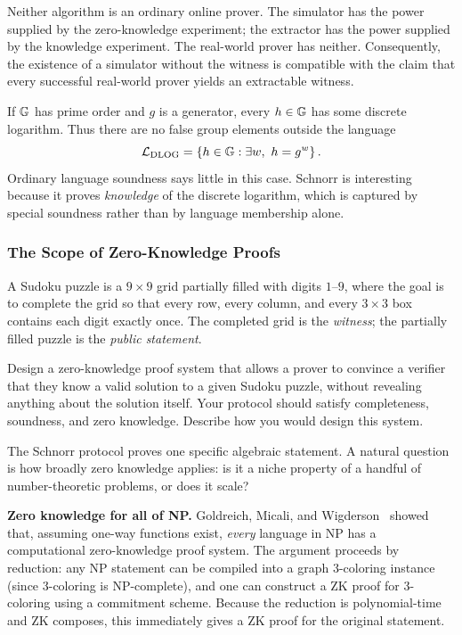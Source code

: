 Neither algorithm is an ordinary online prover. The simulator has the power supplied by the
zero-knowledge experiment; the extractor has the power supplied by the knowledge experiment.
The real-world prover has neither. Consequently, the existence of a simulator without the
witness is compatible with the claim that every successful real-world prover yields an
extractable witness.

\begin{remark}
If $\mathbb{G}$ has prime order and $g$ is a generator, every $h\in\mathbb{G}$ has some discrete logarithm.
Thus there are no false group elements outside the language
\[
    \lang_{\mathrm{DLOG}}=\set{h\in\G:\exists w,\ h=g^w}.
\]
Ordinary language soundness says little in this case. Schnorr is interesting because it proves
\emph{knowledge} of the discrete logarithm, which is captured by special soundness rather than
by language membership alone.
\end{remark}


\subsubsection{The Scope of Zero-Knowledge Proofs}

\begin{exercisebox}
  A Sudoku puzzle is a $9\times 9$ grid partially filled with digits $1$--$9$, where the goal is to complete the grid so that every row, every column, and every $3\times 3$ box contains each digit exactly once. The completed grid is the \emph{witness}; the partially filled puzzle is the \emph{public statement}.

  Design a zero-knowledge proof system that allows a prover to convince a verifier that they know a valid solution to a given Sudoku puzzle, without revealing anything about the solution itself. Your protocol should satisfy completeness, soundness, and zero knowledge. Describe how you would design this system.
\end{exercisebox}

The Schnorr protocol proves one specific algebraic statement. A natural question is how broadly zero knowledge applies: is it a niche property of a handful of number-theoretic problems, or does it scale?

\textbf{Zero knowledge for all of NP.}
Goldreich, Micali, and Wigderson~\cite{GMW86} showed that, assuming one-way functions exist, \emph{every} language in NP has a computational zero-knowledge proof system. The argument proceeds by reduction: any NP statement can be compiled into a graph 3-coloring instance (since 3-coloring is NP-complete), and one can construct a ZK proof for 3-coloring using a commitment scheme. Because the reduction is polynomial-time and ZK composes, this immediately gives a ZK proof for the original statement.

